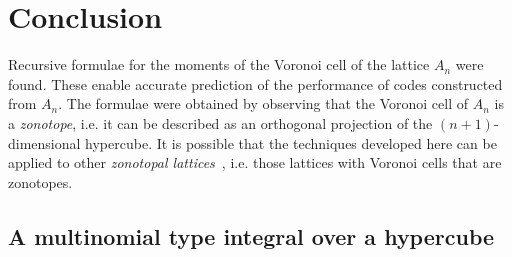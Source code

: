 \documentclass[journal]{IEEEtran}
\begin{document}
\section{Conclusion}

Recursive formulae for the moments of the Voronoi cell of the lattice $A_n$ were found.  These enable accurate prediction of the performance of codes constructed from $A_n$.  The formulae were obtained by observing that the Voronoi cell of $A_n$ is a \emph{zonotope}, i.e. it can be described as an orthogonal projection of the $(n+1)$-dimensional hypercube.  It is possible that the techniques developed here can be applied to other \emph{zonotopal lattices}~\cite{Vallentin_space_tiling_zonotope_2004}, i.e. those lattices with Voronoi cells that are zonotopes.

\appendix


\subsection{A multinomial type integral over a hypercube}\label{sec:mult-type-integr}
\end{document}
